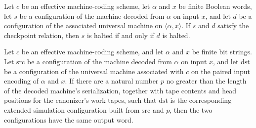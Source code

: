 \begin{lemma}
\label{Turing.universalRelation_halt}
\leanok
{}
Let $c$ be an effective machine-coding scheme, let $\alpha$ and $x$ be finite Boolean
words, let $s$ be a configuration of the machine decoded from $\alpha$ on input $x$, and
let $d$ be a configuration of the associated universal machine on
$\langle\alpha,x\rangle$. If $s$ and $d$ satisfy the checkpoint relation, then $s$ is
halted if and only if $d$ is halted.
\end{lemma}

\begin{lemma}
\label{Turing.universalRelation_output}
\leanok
{}
Let $c$ be an effective machine-coding scheme, and let $\alpha$ and $x$ be finite bit
strings. Let $\mathrm{src}$ be a configuration of the machine decoded from $\alpha$ on
input $x$, and let $\mathrm{dst}$ be a configuration of the universal machine associated
with $c$ on the paired input encoding of $\alpha$ and $x$. If there are a natural number
$p$ no greater than the length of the decoded machine's serialization, together with
tape contents and head positions for the canonizer's work tapes, such that
$\mathrm{dst}$ is the corresponding extended simulation configuration built from
$\mathrm{src}$ and $p$, then the two configurations have the same output word.
\end{lemma}

